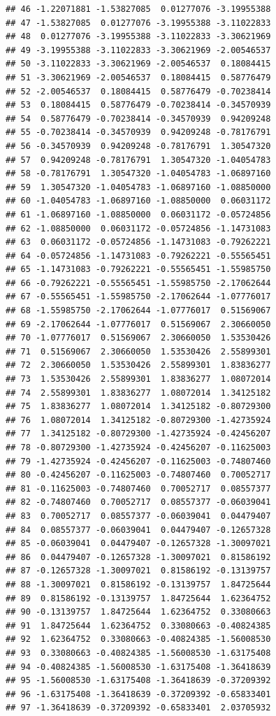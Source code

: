 \documentclass[
]{book}
\theoremstyle{definition}
\theoremstyle{definition}
\theoremstyle{definition}
\theoremstyle{definition}
\theoremstyle{remark}
\begin{document}
\begin{verbatim}
## 46 -1.22071881 -1.53827085  0.01277076 -3.19955388
## 47 -1.53827085  0.01277076 -3.19955388 -3.11022833
## 48  0.01277076 -3.19955388 -3.11022833 -3.30621969
## 49 -3.19955388 -3.11022833 -3.30621969 -2.00546537
## 50 -3.11022833 -3.30621969 -2.00546537  0.18084415
## 51 -3.30621969 -2.00546537  0.18084415  0.58776479
## 52 -2.00546537  0.18084415  0.58776479 -0.70238414
## 53  0.18084415  0.58776479 -0.70238414 -0.34570939
## 54  0.58776479 -0.70238414 -0.34570939  0.94209248
## 55 -0.70238414 -0.34570939  0.94209248 -0.78176791
## 56 -0.34570939  0.94209248 -0.78176791  1.30547320
## 57  0.94209248 -0.78176791  1.30547320 -1.04054783
## 58 -0.78176791  1.30547320 -1.04054783 -1.06897160
## 59  1.30547320 -1.04054783 -1.06897160 -1.08850000
## 60 -1.04054783 -1.06897160 -1.08850000  0.06031172
## 61 -1.06897160 -1.08850000  0.06031172 -0.05724856
## 62 -1.08850000  0.06031172 -0.05724856 -1.14731083
## 63  0.06031172 -0.05724856 -1.14731083 -0.79262221
## 64 -0.05724856 -1.14731083 -0.79262221 -0.55565451
## 65 -1.14731083 -0.79262221 -0.55565451 -1.55985750
## 66 -0.79262221 -0.55565451 -1.55985750 -2.17062644
## 67 -0.55565451 -1.55985750 -2.17062644 -1.07776017
## 68 -1.55985750 -2.17062644 -1.07776017  0.51569067
## 69 -2.17062644 -1.07776017  0.51569067  2.30660050
## 70 -1.07776017  0.51569067  2.30660050  1.53530426
## 71  0.51569067  2.30660050  1.53530426  2.55899301
## 72  2.30660050  1.53530426  2.55899301  1.83836277
## 73  1.53530426  2.55899301  1.83836277  1.08072014
## 74  2.55899301  1.83836277  1.08072014  1.34125182
## 75  1.83836277  1.08072014  1.34125182 -0.80729300
## 76  1.08072014  1.34125182 -0.80729300 -1.42735924
## 77  1.34125182 -0.80729300 -1.42735924 -0.42456207
## 78 -0.80729300 -1.42735924 -0.42456207 -0.11625003
## 79 -1.42735924 -0.42456207 -0.11625003 -0.74807460
## 80 -0.42456207 -0.11625003 -0.74807460  0.70052717
## 81 -0.11625003 -0.74807460  0.70052717  0.08557377
## 82 -0.74807460  0.70052717  0.08557377 -0.06039041
## 83  0.70052717  0.08557377 -0.06039041  0.04479407
## 84  0.08557377 -0.06039041  0.04479407 -0.12657328
## 85 -0.06039041  0.04479407 -0.12657328 -1.30097021
## 86  0.04479407 -0.12657328 -1.30097021  0.81586192
## 87 -0.12657328 -1.30097021  0.81586192 -0.13139757
## 88 -1.30097021  0.81586192 -0.13139757  1.84725644
## 89  0.81586192 -0.13139757  1.84725644  1.62364752
## 90 -0.13139757  1.84725644  1.62364752  0.33080663
## 91  1.84725644  1.62364752  0.33080663 -0.40824385
## 92  1.62364752  0.33080663 -0.40824385 -1.56008530
## 93  0.33080663 -0.40824385 -1.56008530 -1.63175408
## 94 -0.40824385 -1.56008530 -1.63175408 -1.36418639
## 95 -1.56008530 -1.63175408 -1.36418639 -0.37209392
## 96 -1.63175408 -1.36418639 -0.37209392 -0.65833401
## 97 -1.36418639 -0.37209392 -0.65833401  2.03705932
\end{verbatim}
\end{document}
